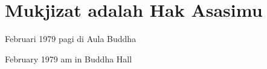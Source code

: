 \chapter{Mukjizat adalah Hak Asasimu} %

 Februari 1979 pagi di Aula Buddha

 February 1979 am in Buddha Hall

